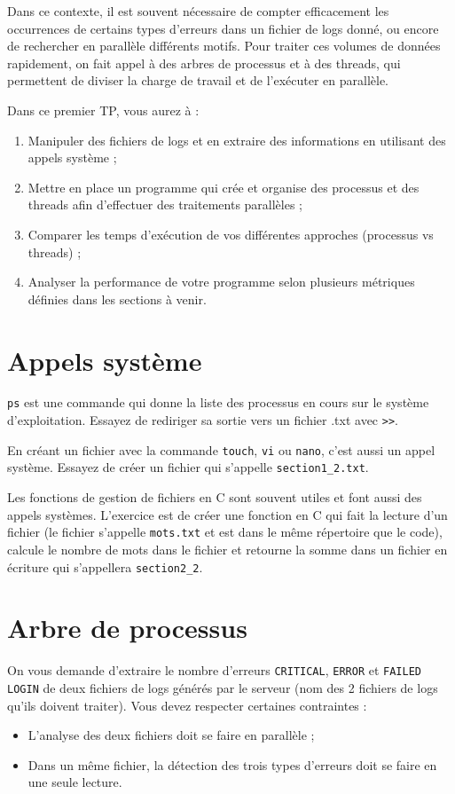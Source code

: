 \documentclass[12pt,addpoints]{exam} %
\begin{document}
\vspace{0.5cm}
Dans ce contexte, il est souvent nécessaire de compter efficacement les occurrences de certains types d’erreurs dans un fichier de logs donné, ou encore de rechercher en parallèle différents motifs. Pour traiter ces volumes de données rapidement, on fait appel à des arbres de processus et à des threads, qui permettent de diviser la charge de travail et de l’exécuter en parallèle.


\vspace{0.5cm}
Dans ce premier TP, vous aurez à :
\begin{enumerate}
\item Manipuler des fichiers de logs et en extraire des informations en utilisant des appels système ;
\item Mettre en place un programme qui crée et organise des processus et des threads afin d’effectuer des traitements parallèles ;
\item Comparer les temps d’exécution de vos différentes approches (processus vs threads) ;
\item Analyser la performance de votre programme selon plusieurs métriques définies dans les sections à venir.
\end{enumerate}

\vspace{1cm}
\section{Appels système}


\texttt{ps} est une commande qui donne la liste des processus en cours sur le système d’exploitation. Essayez de rediriger sa sortie vers un fichier .txt avec \texttt{>>}.


En créant un fichier avec la commande \texttt{touch}, \texttt{vi} ou \texttt{nano}, c’est aussi un appel système. Essayez de créer un fichier qui s’appelle \texttt{section1\_2.txt}.


Les fonctions de gestion de fichiers en C sont souvent utiles et font aussi des appels systèmes. L’exercice est de créer une fonction en C qui fait la lecture d’un fichier (le fichier s’appelle \texttt{mots.txt} et est dans le même répertoire que le code), calcule le nombre de mots dans le fichier et retourne la somme dans un fichier en écriture qui s’appellera \texttt{section2\_2}.


\vspace{1cm}
\section{Arbre de processus}
On vous demande d’extraire le nombre d’erreurs \texttt{CRITICAL}, \texttt{ERROR} et \texttt{FAILED LOGIN} de deux fichiers de logs générés par le serveur (nom des 2 fichiers de logs qu’ils doivent traiter). Vous devez respecter certaines contraintes :
\begin{itemize}
\item L’analyse des deux fichiers doit se faire en parallèle ;
\item Dans un même fichier, la détection des trois types d’erreurs doit se faire en une seule lecture.
\end{itemize}
\end{document}
